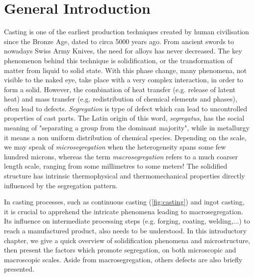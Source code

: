 \chapter{General Introduction}
Casting is one of the earliest production techniques created by human civilisation since the Bronze Age, dated to circa 5000 years ago. 
From ancient swords to nowadays Swiss Army Knives, the need for alloys has never decreased.
The key phenomenon behind this technique is solidification, or the transformation of matter from liquid to solid state. With this phase change, 
many phenomena, not visible to the naked eye, take place with a very complex interaction, in order to form a solid. 
However, the combination of heat transfer (e.g. release of latent heat) and mass transfer (e.g. redistribution of chemical
elements and phases), often lead to defects. \emph{Segregation} is type of defect which can lead to uncontrolled properties of cast parts. 
The Latin origin of this word, \emph{segregatus}, has the social meaning of "separating a group from the dominant majority", while 
in metallurgy it means a non uniform distribution of chemical species. Depending on the scale, we may speak of \emph{microsegregation}
when the heterogeneity spans some few hundred microns, whereas the term \emph{macrosegregation} refers to a much coarser length scale, ranging
from some millimetres to some meters! The solidified structure has intrinsic thermophysical and thermomechanical properties directly influenced by the segregation pattern. 

In casting processes, such as continuous casting (\cref{fig:casting}) and ingot casting, it is crucial to apprehend 
the intricate phenomena leading to macrosegregation. Its influence on intermediate processing steps (e.g. forging, coating, welding,...)
to reach a manufactured product, also needs to be understood.
In this introductory chapter, we give a quick overview of solidification phenomena and microstructure, then present the factors which
promote segregation, on both microscopic and macroscopic scales. Aside from macrosegregation, others defects are also briefly presented.

